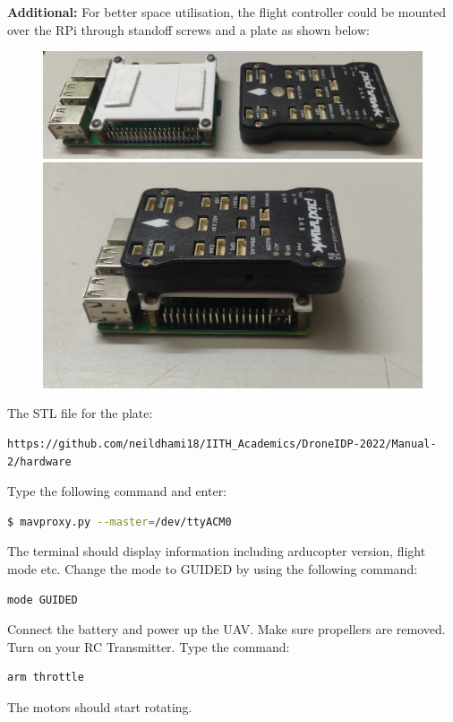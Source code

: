 \documentclass{article}
\begin{document}
\textbf{Additional:} For better space utilisation, the flight controller could be mounted over the RPi through standoff screws and a plate as shown below:
\begin{figure}[!htb]
              \includegraphics[width=\linewidth]{./figs/hardware/separate.jpeg}
            \endminipage\hfill
              \includegraphics[width=\linewidth]{./figs/hardware/together.jpeg}
            \endminipage\hfill
\end{figure}
The STL file for the plate:
\begin{lstlisting}
https://github.com/neildhami18/IITH_Academics/DroneIDP-2022/Manual-2/hardware
\end{lstlisting}


Type the following command and enter:
\begin{lstlisting}[language=bash]
    $ mavproxy.py --master=/dev/ttyACM0 
\end{lstlisting}
The terminal should display information including arducopter version, flight mode etc. Change the mode to GUIDED by using the following command:
\begin{lstlisting}[language=bash]
    mode GUIDED
\end{lstlisting}
Connect the battery and power up the UAV. Make sure propellers are removed. Turn on your RC Transmitter. Type the command:
\begin{lstlisting}[language=bash]
    arm throttle
\end{lstlisting}
The motors should start rotating.
\end{document}
